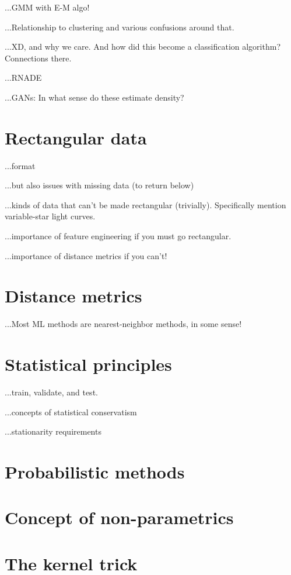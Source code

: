 \documentclass[12pt, letterpaper]{article}
\begin{document}
...GMM with E-M algo!

...Relationship to clustering and various confusions around that.

...XD, and why we care. And how did this become a classification algorithm? Connections there.

...RNADE

...GANs: In what sense do these estimate density?

\section{Rectangular data}

...format

...but also issues with missing data (to return below)

...kinds of data that can't be made rectangular (trivially). Specifically mention variable-star light curves.

...importance of feature engineering if you must go rectangular.

...importance of distance metrics if you can't!

\section{Distance metrics}

...Most ML methods are nearest-neighbor methods, in some sense!

\section{Statistical principles}

...train, validate, and test.

...concepts of statistical conservatism

...stationarity requirements

\section{Probabilistic methods}

\section{Concept of non-parametrics}

\section{The kernel trick}
\end{document}
